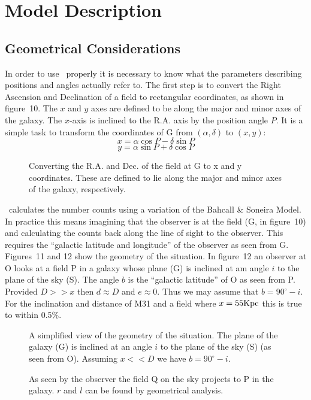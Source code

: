 \newpage
\section{Model Description}

\subsection{Geometrical Considerations}

In order to use \egm\ properly it is necessary to know what the parameters
describing positions and angles actually refer to. The first step is to
convert the Right Ascension and Declination of a field to rectangular
coordinates, as shown in figure~10. The $x$ and $y$ axes are defined to
be along the major and minor axes of the galaxy. The $x$-axis is inclined
to the R.A. axis by the position angle $P$. It is a simple task to transform
the coordinates of G from $(\alpha,\delta)$ to $(x,y)$:
\[
x = \alpha \cos P - \delta \sin P 
\]
\[
y = \alpha \sin P + \delta \cos P
\]
\begin{figure}[b]
\centerline{}
\caption{Converting the R.A. and Dec. of the field at G to {\sf x} and
{\sf y} coordinates. These are defined to lie along the major and minor
axes of the galaxy, respectively.}
\end{figure}

\egm\ calculates the number counts using a variation of the Bahcall \&
Soneira Model. In practice this means imagining that the observer is at
the field (G, in figure~10) and calculating the counts back along the line
of sight to the observer. This requires the ``galactic latitude and
longitude'' of the observer as seen from G. Figures~11 and 12 show the
geometry of the situation. In figure~12 an observer at O looks at a field P
in a galaxy whose plane (G) is inclined at am angle $i$ to the plane of the
sky (S). The angle $b$ is the ``galactic latitude'' of O as seen from P.
Provided $D >> x$ then $d \approx D$ and $e \approx 0$. Thus we may assume
that $b = 90^\circ - i $. For the inclination and distance of M31 and a field
where $x = 55 {\rm Kpc}$ this is true to within 0.5\%.
\begin{figure}[p]
\centerline{}
\caption{A simplified view of the geometry of the situation. The plane of
the galaxy (G) is inclined at an angle $i$ to the plane of the sky (S)
(as seen from O). Assuming $ x << D$ we have $b = 90^\circ - i$.}
\end{figure}
\begin{figure}[p]
\centerline{}
\caption{As seen by the observer the field Q on the sky projects to P in the
galaxy. $r$ and $l$ can be found by geometrical analysis.}
\end{figure}

